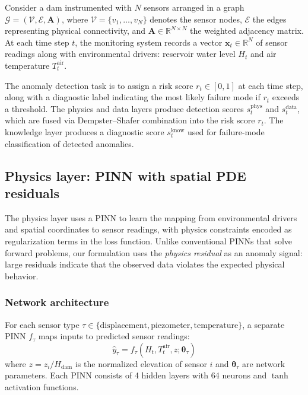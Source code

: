 \documentclass[preprint,12pt,review]{elsarticle}
\begin{document}
Consider a dam instrumented with $N$ sensors arranged in a graph $\mathcal{G} = (\mathcal{V}, \mathcal{E}, \mathbf{A})$, where $\mathcal{V} = \{v_1, \ldots, v_N\}$ denotes the sensor nodes, $\mathcal{E}$ the edges representing physical connectivity, and $\mathbf{A} \in \mathbb{R}^{N \times N}$ the weighted adjacency matrix. At each time step $t$, the monitoring system records a vector $\mathbf{x}_t \in \mathbb{R}^N$ of sensor readings along with environmental drivers: reservoir water level $H_t$ and air temperature $T_t^{\mathrm{air}}$.

The anomaly detection task is to assign a risk score $r_t \in [0, 1]$ at each time step, along with a diagnostic label indicating the most likely failure mode if $r_t$ exceeds a threshold. The physics and data layers produce detection scores $s_t^{\mathrm{phys}}$ and $s_t^{\mathrm{data}}$, which are fused via Dempster--Shafer combination into the risk score $r_t$. The knowledge layer produces a diagnostic score $s_t^{\mathrm{know}}$ used for failure-mode classification of detected anomalies.

\subsection{Physics layer: PINN with spatial PDE residuals}
\label{sec:pinn}

The physics layer uses a PINN to learn the mapping from environmental drivers and spatial coordinates to sensor readings, with physics constraints encoded as regularization terms in the loss function. Unlike conventional PINNs that solve forward problems, our formulation uses the \emph{physics residual} as an anomaly signal: large residuals indicate that the observed data violates the expected physical behavior.

\subsubsection{Network architecture}

For each sensor type $\tau \in \{\text{displacement}, \text{piezometer}, \text{temperature}\}$, a separate PINN $f_\tau$ maps inputs to predicted sensor readings:
\begin{equation}
\hat{y}_\tau = f_\tau(H_t, T_t^{\mathrm{air}}, z; \boldsymbol{\theta}_\tau)
\label{eq:pinn_forward}
\end{equation}
where $z = z_i / H_{\mathrm{dam}}$ is the normalized elevation of sensor $i$ and $\boldsymbol{\theta}_\tau$ are network parameters. Each PINN consists of 4 hidden layers with 64 neurons and $\tanh$ activation functions.
\end{document}
